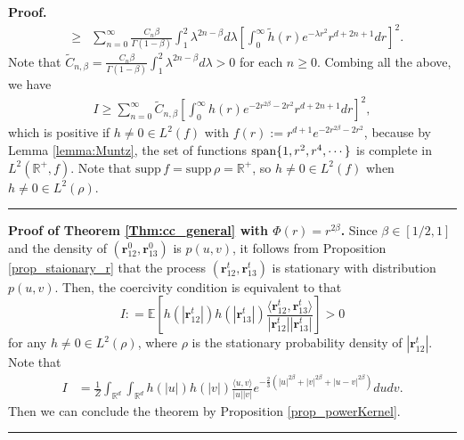 \documentclass[]{elsarticle}
\def\R{\mathbb{R}}
\def\E{\mathbb{E}}
\newcommand{\mbf}[1]{\boldsymbol{#1}}
\newcommand{\innerp}[2]{\langle #1,#2 \rangle}
\newcommand{\br}{\mbf{r}}
\newtheorem{proposition}[theorem]{Proposition}
\newenvironment{proof}[1][Proof]{\noindent\textbf{#1.} }{\ \rule{0.5em}{0.5em}}
\numberwithin{equation}{section}
\numberwithin{theorem}{section}
\begin{document}
\begin{proof}
\begin{eqnarray*}
&\geq&\sum_{n=0}^{\infty}\frac{C_n\beta}{\Gamma(1-\beta)}\int_1^2\lambda^{2n-\beta} d\lambda \left[\int_{0}^{\infty}\widetilde h(r) e^{-\lambda r^2 }r^{d+2n+1}dr\right]^2. 
\end{eqnarray*}
Note that 
$\tilde{C}_{n,\beta}=\frac{C_n\beta}{\Gamma(1-\beta)}\int_1^2\lambda^{2n-\beta} d\lambda>0$ for each $n\geq 0$. Combing all the above, we have 
\begin{eqnarray*}
I\geq \sum_{n=0}^{\infty}\tilde{C}_{n,\beta}\left[\int_{0}^{\infty}h(r)e^{-2r^{2\beta}-2 r^2}r^{d+2n+1}dr\right]^2, 
\end{eqnarray*}
which is positive if $h\neq 0 \in L^2(f)$ with $f(r):=r^{d+1}e^{-2r^{2\beta}-2 r^2}$, because by Lemma \ref{lemma:Muntz}, the set of functions ${\rm span}\{1,r^2, r^4,\cdots\}$ is complete in $L^2(\R^+, f)$. Note that $\mathrm{supp}\,f = \mathrm{supp }\,\rho = \R^+$, so $h\neq 0 \in L^2(f)$ when $h\neq 0 \in L^2(\rho)$. 
\end{proof}

\bigskip
\begin{proof}[Proof of Theorem \ref{Thm:cc_general} with $\Phi(r)=r^{2\beta}$] Since $\beta\in [1/2,1]$ and the density of $(\br_{12}^0,\br_{13}^0)$ is $p(u,v)$, it follows from Proposition \ref{prop_staionary_r} that the process $(\br_{12}^t,\br_{13}^t)$ is stationary  with distribution $p(u,v)$. Then, the coercivity condition is equivalent to that  
\[
I : = \E[h(|\br_{12}^t|)h(|\br_{13}^t|)\frac{\innerp{\br_{12}^t}{\br_{13}^t}}{|\br_{12}^t||\br_{13}^t|}]>0
\]
for any $h\neq 0\in L^2(\rho)$, where $\rho$ is the stationary probability density of $|\br_{12}^t|$. 
Note that 
 \begin{align*}
I %
&=\frac{1}{Z}\int_{\R^d}\int_{\R^d}h(|u|)h(|v|)\frac{\langle u,v \rangle}{|u||v|}e^{-\frac{2}{3} (|u|^{2\beta}+ |v|^{2\beta}+|u-v|^{2\beta}) }dudv.
\end{align*}
Then we can conclude the theorem by Proposition \ref{prop_powerKernel}.
\end{proof}
\end{document}
